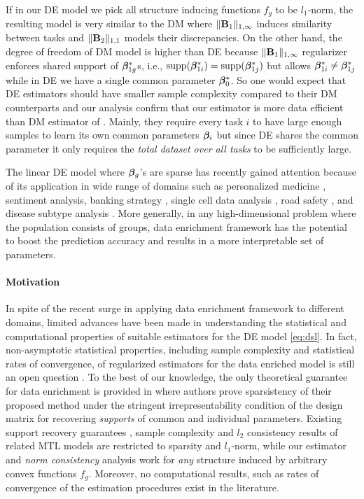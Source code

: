 If in our DE model we pick all structure inducing functions $f_g$ to be $l_1$-norm, the resulting model is very similar to the DM where $\|\mathbf{B}_1\|_{1, \infty}$ induces similarity between tasks and $\|\mathbf{B}_2\|_{1,1}$ models their discrepancies. On the other hand, the degree of freedom of DM model is higher than DE because $\|\mathbf{B}_1\|_{1, \infty}$ regularizer enforces shared support of $\boldsymbol{\beta}^*_{1g}$s, i.e., $\text{supp}(\boldsymbol{\beta}_{1i}^*) = \text{supp}(\boldsymbol{\beta}_{1j}^*)$ but allows $\boldsymbol{\beta}_{1i}^* \neq \boldsymbol{\beta}_{1j}^*$ while in DE we have a single common parameter $\boldsymbol{\beta}_0^*$. So one would expect that DE estimators should have smaller sample complexity compared to their DM counterparts and our analysis confirm that our estimator is more data efficient than DM estimator of \cite{jrsr10}. Mainly, they require every task $i$ to have large enough samples to learn its own common parameters $\boldsymbol{\beta}_i$ but since DE shares the common parameter it only requires the {\em{total dataset over all tasks}} to be sufficiently large.

The linear DE model where $\boldsymbol{\beta}_g$'s are sparse has recently gained attention because of its application in wide range of domains such as personalized medicine \cite{domu16}, sentiment analysis, banking strategy \cite{grti16}, single cell data analysis \cite{olvi15}, road safety \cite{olvi14}, and disease subtype analysis \cite{domu16}.
More generally, in any high-dimensional problem where the population consists of groups, data enrichment framework has the potential to boost the prediction accuracy and results in a more interpretable set of parameters.

\paragraph{Motivation} In spite of the recent surge in applying data enrichment framework to different domains, limited advances have been made in
understanding the statistical and computational properties of suitable estimators for the DE model \eqref{eq:dsl}.
In fact, non-asymptotic statistical properties, including sample complexity and statistical rates of convergence, of regularized estimators for the data enriched model is still an open question \cite{grti16, olvi14}.
To the best of our knowledge, the only theoretical guarantee for data enrichment is provided in \cite{olvi15} where authors prove sparsistency of their proposed method under the stringent irrepresentability condition of the design matrix for recovering \emph{supports} of common and individual parameters.
Existing support recovery guarantees \cite{olvi15}, sample complexity and $l_2$ consistency results \cite{jrsr10} of related MTL models are restricted to sparsity and $l_1$-norm, while our estimator and \emph{norm consistency} analysis work for \emph{any} structure induced by arbitrary convex functions $f_g$. 
Moreover, no computational results, such as rates of convergence of the estimation procedures exist in the literature.


